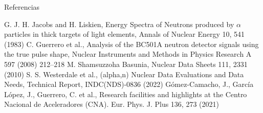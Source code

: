 \documentclass[11pt]{beamer}
\newcommand{\an}{($\alpha$,n) }
\begin{document}
\begin{frame}{Referencias}
\begin{thebibliography}{5}
	G. J. H. Jacobs and H. Liskien, Energy Spectra of Neutrons produced by $\alpha$ particles in thick targets of light elements, Annals of Nuclear Energy 10, 541 (1983)
	C. Guerrero et al., Analysis of the BC501A neutron detector signals using the true pulse shape, Nuclear Instruments and Methods in Physics Research A 597 (2008) 212–218
	M. Shamsuzzoha Basunia, Nuclear Data Sheets 111, 2331 (2010)
	S. S. Westerdale et al., (alpha,n) Nuclear Data Evaluations and Data Needs, Technical Report, INDC(NDS)-0836 (2022)
	Gómez-Camacho, J., García López, J., Guerrero, C. et al., Research facilities and highlights at the Centro Nacional de Aceleradores (CNA). Eur. Phys. J. Plus 136, 273 (2021)
\end{thebibliography}
\end{frame}
\end{document}
